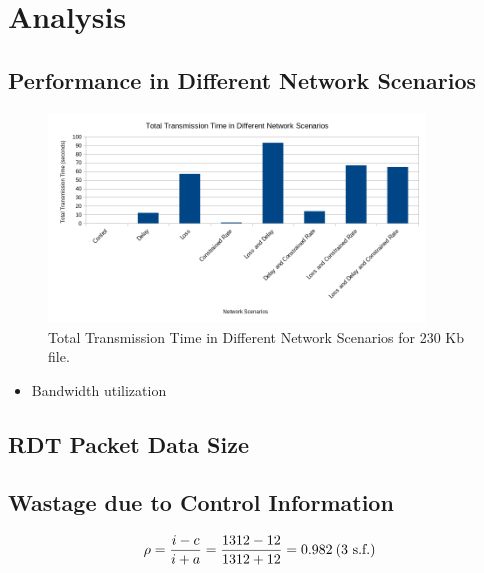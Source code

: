 \section{Analysis}

\subsection{Performance in Different Network Scenarios}

\begin{figure}[H]
\begin{center}
    \includegraphics[width=100mm]{images/performance-network-scenarios.png}
\end{center}
\caption{Total Transmission Time in Different Network Scenarios for 230 Kb file.}
\end{figure}

\begin{itemize}
    \item Bandwidth utilization
\end{itemize}

\subsection{RDT Packet Data Size}


\subsection{Wastage due to Control Information}

\begin{align*}
    \rho = \frac{i - c}{i + a} = \frac{1312 - 12}{1312 + 12} = 0.982 \text{\:(3 s.f.)}
\end{align*}